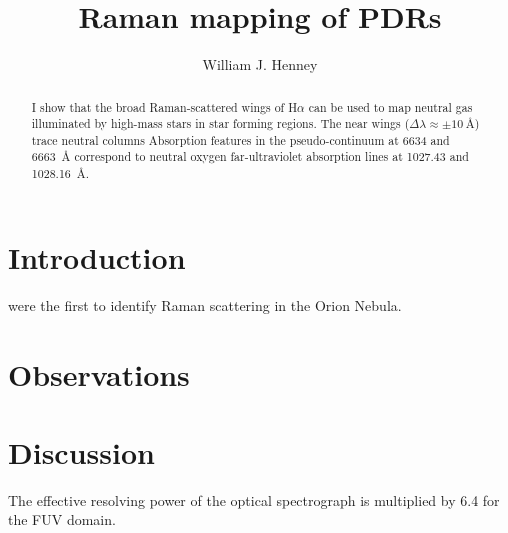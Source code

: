 \documentclass[iop, apj]{emulateapj}
\begin{document}
\title{Raman mapping of PDRs}
\author{William J. Henney}

\begin{abstract}
  I show that the broad Raman-scattered wings of H\(\alpha\) can be used to
  map neutral gas illuminated by high-mass stars in star forming
  regions. The near wings (\(\Delta\lambda \approx \pm \SI{10}{\angstrom}\)) trace neutral columns Absorption features in the pseudo-continuum at 6634 and
  6663~\AA{} correspond to neutral oxygen far-ultraviolet absorption
  lines at 1027.43 and 1028.16~\AA{}.
\end{abstract}

\section{Introduction}
\label{sec:introduction}

\citet{Dopita:2016a} were the first to identify Raman scattering in the Orion Nebula.

\section{Observations}
\label{sec:observations}

\section{Discussion}
\label{sec:discussion}

The effective resolving power of the optical spectrograph is multiplied by 6.4 for the FUV domain. 


\end{document}
